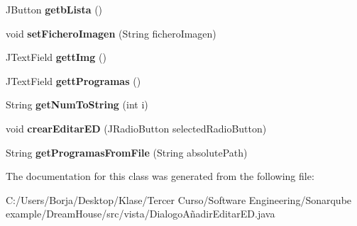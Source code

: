 \begin{DoxyCompactItemize}
J\+Button {\bfseries getb\+Lista} ()
\item 
\mbox{\label{classvista_1_1_dialogo_a_xC3_xB1adir_editar_e_d_a18b53c8b25fb4c85f3dd4293720d3ecd}} 
void {\bfseries set\+Fichero\+Imagen} (String fichero\+Imagen)
\item 
\mbox{\label{classvista_1_1_dialogo_a_xC3_xB1adir_editar_e_d_acd30bec076e407584365c29aa9d48bc6}} 
J\+Text\+Field {\bfseries gett\+Img} ()
\item 
\mbox{\label{classvista_1_1_dialogo_a_xC3_xB1adir_editar_e_d_a06aa02b72b0bb66faa5816e091c54e85}} 
J\+Text\+Field {\bfseries gett\+Programas} ()
\item 
\mbox{\label{classvista_1_1_dialogo_a_xC3_xB1adir_editar_e_d_a57f13abe4c17f09f1d1cccdef6644697}} 
String {\bfseries get\+Num\+To\+String} (int i)
\item 
\mbox{\label{classvista_1_1_dialogo_a_xC3_xB1adir_editar_e_d_a4cc6d5bf23ff4ea275fd32b49cd4572a}} 
void {\bfseries crear\+Editar\+ED} (J\+Radio\+Button selected\+Radio\+Button)
\item 
\mbox{\label{classvista_1_1_dialogo_a_xC3_xB1adir_editar_e_d_aed9f1d25c1f24e37ced26ef7025b2b01}} 
String {\bfseries get\+Programas\+From\+File} (String absolute\+Path)
\end{DoxyCompactItemize}


The documentation for this class was generated from the following file\+:\begin{DoxyCompactItemize}
\item 
C\+:/\+Users/\+Borja/\+Desktop/\+Klase/\+Tercer Curso/\+Software Engineering/\+Sonarqube example/\+Dream\+House/src/vista/Dialogo\+Añadir\+Editar\+E\+D.\+java\end{DoxyCompactItemize}
